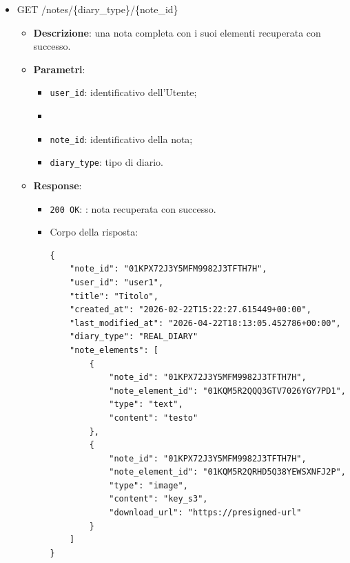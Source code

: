 \documentclass[a4paper,12pt]{article}
\newcommand{\code}[1]{{\ttfamily\textcolor{purple!85!black}{#1}}}
\begin{document}
\begin{itemize}
\begin{itemize}
            \item \textbf{Errori}:
            \begin{itemize}
                \item \texttt{400 Bad Request}: \texttt{Invalid diary\_type} (ValueError su enum DiaryType).
                \item \texttt{500 Internal Server Error}: errore di \texttt{service.list\_notes}.
            \end{itemize}
        \end{itemize}

    \item \code{GET /notes/\{diary\_type\}/\{note\_id\}}
        \begin{itemize}
            \item \textbf{Descrizione}: una nota completa con i suoi elementi recuperata con successo.

            \item \textbf{Parametri}:
            \begin{itemize}
                \item \texttt{user\_id}: identificativo dell'Utente;
                \item \item \texttt{note\_id}: identificativo della nota;
                \item \texttt{diary\_type}: tipo di diario.
            \end{itemize}

            \item \textbf{Response}:
            \begin{itemize}
                \item \texttt{200 OK}: : nota recuperata con successo.
                \item Corpo della risposta:
\begin{verbatim}
{
    "note_id": "01KPX72J3Y5MFM9982J3TFTH7H",
    "user_id": "user1",
    "title": "Titolo",
    "created_at": "2026-02-22T15:22:27.615449+00:00",
    "last_modified_at": "2026-04-22T18:13:05.452786+00:00",
    "diary_type": "REAL_DIARY"
    "note_elements": [
        {
            "note_id": "01KPX72J3Y5MFM9982J3TFTH7H",
            "note_element_id": "01KQM5R2QQQ3GTV7026YGY7PD1",
            "type": "text",
            "content": "testo"
        },
        {
            "note_id": "01KPX72J3Y5MFM9982J3TFTH7H",
            "note_element_id": "01KQM5R2QRHD5Q38YEWSXNFJ2P",
            "type": "image",
            "content": "key_s3",
            "download_url": "https://presigned-url"
        }
    ]
}
\end{verbatim}
            \end{itemize}


\end{itemize}
\end{itemize}
\end{document}
